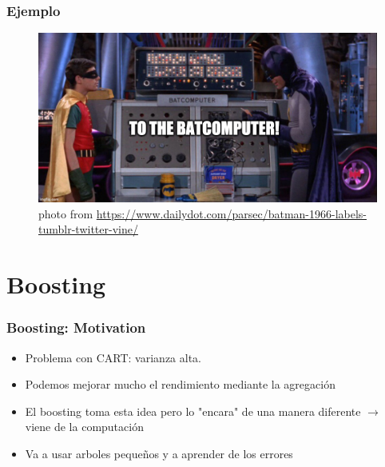 \documentclass[
  shownotes,
  xcolor={svgnames},
  hyperref={colorlinks,citecolor=DarkBlue,linkcolor=andesred,urlcolor=DarkBlue}
  , aspectratio=169]{beamer}
\begin{document}
\begin{frame}[fragile]
\frametitle{Ejemplo}
\begin{figure}[H] \centering
  \centering
  \includegraphics[scale=0.35]{figures/baticomputer_meme.jpg}
  \\
  \tiny photo from \url{https://www.dailydot.com/parsec/batman-1966-labels-tumblr-twitter-vine/}
\end{figure}

\end{frame}


\section{Boosting}
\begin{frame}[fragile]
\frametitle{Boosting: Motivation}

\begin{itemize}
  \item Problema con CART: varianza alta.
  \medskip
   \item Podemos mejorar mucho el rendimiento mediante la agregación 
   \medskip 
   \item El boosting toma esta idea pero lo "encara" de una manera diferente $\rightarrow$ viene de la computación
   \medskip
   \item Va a usar arboles pequeños y a aprender de los errores


\end{itemize}
\end{frame}
\end{document}
